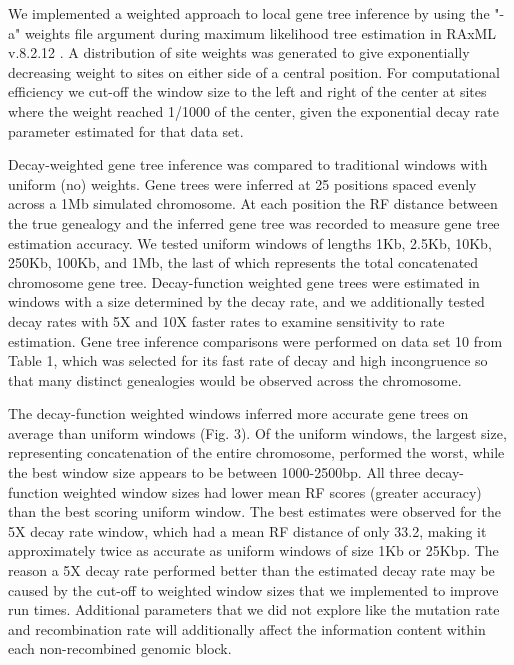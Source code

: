 \documentclass[11pt]{article}
\begin{document}

We implemented a weighted approach to local gene tree inference by using the "-a" weights file argument during maximum likelihood tree estimation in RAxML v.8.2.12 \citep{stamatakis_raxml_2014}. A distribution of site weights was generated to give exponentially decreasing weight to sites on either side of a central position. For computational efficiency we cut-off the window size to the left and right of the center at sites where the weight reached 1/1000 of the center, given the exponential decay rate parameter estimated for that data set.

Decay-weighted gene tree inference was compared to traditional windows with uniform (no) weights. Gene trees were inferred at 25 positions spaced evenly across a 1Mb simulated chromosome. At each position the RF distance between the true genealogy and the inferred gene tree was recorded to measure gene tree estimation accuracy. We tested uniform windows of lengths 1Kb, 2.5Kb, 10Kb, 250Kb, 100Kb, and 1Mb, the last of which represents the total concatenated chromosome gene tree. Decay-function weighted gene trees were estimated in windows with a size determined by the decay rate, and we additionally tested decay rates with 5X and 10X faster rates to examine sensitivity to rate estimation. Gene tree inference comparisons were performed on data set 10 from Table 1, which was selected for its fast rate of decay and high incongruence so that many distinct genealogies would be observed across the chromosome.

The decay-function weighted windows inferred more accurate gene trees on average than uniform windows (Fig. 3). Of the uniform windows, the largest size, representing concatenation of the entire chromosome, performed the worst, while the best window size appears to be between 1000-2500bp. All three decay-function weighted window sizes had lower mean RF scores (greater accuracy) than the best scoring uniform window. The best estimates were observed for the 5X decay rate window, which had a mean RF distance of only 33.2, making it approximately twice as accurate as uniform windows of size 1Kb or 25Kbp. The reason a 5X decay rate performed better than the estimated decay rate may be caused by the cut-off to weighted window sizes that we implemented to improve run times. Additional parameters that we did not explore like the mutation rate and recombination rate will additionally affect the information content within each non-recombined genomic block.
\end{document}
